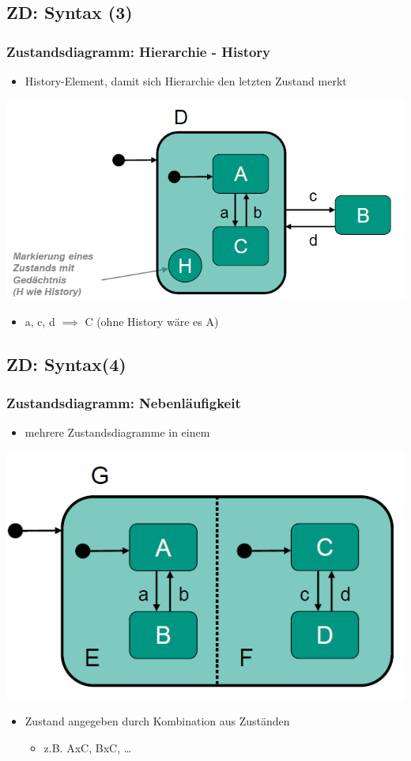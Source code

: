 \documentclass[18pt]{beamer}
\begin{document}
	\subsection{ZD: Syntax (3)}
	\begin{frame}
		\frametitle{Zustandsdiagramm: Hierarchie - History}
		\begin{itemize}
			\item  History-Element, damit sich Hierarchie den letzten Zustand merkt
		\end{itemize}
		\includegraphics[scale=0.5]{./pics/tut2/auto_hier-hist.png}
		\pause	
		\begin{itemize}
			\item a, c, d $\implies$ C (ohne History wäre es A)
		\end{itemize}
	\end{frame}

	\subsection{ZD: Syntax(4)}
	\begin{frame}
		\frametitle{Zustandsdiagramm: Nebenläufigkeit}	
		\begin{itemize}
			\item  mehrere Zustandsdiagramme in einem
		\end{itemize}
		\centering
		\includegraphics[scale=0.5]{./pics/tut2/auto_par.png}	
		\begin{itemize}
			\item Zustand angegeben durch Kombination aus Zuständen
			\begin{itemize}
				\item z.B. AxC, BxC, \dots
			\end{itemize} 
		\end{itemize}
	\end{frame}
\end{document}
